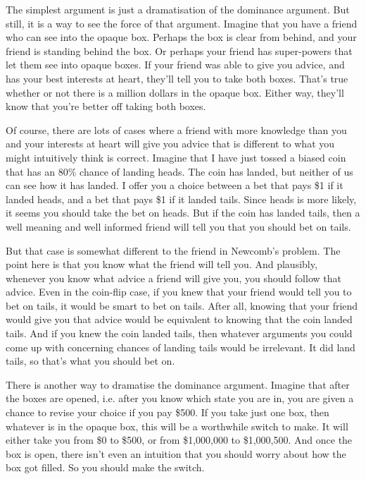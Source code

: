The simplest argument is just a dramatisation of the dominance argument. But still, it is a way to see the force of that argument. Imagine that you have a friend who can see into the opaque box. Perhaps the box is clear from behind, and your friend is standing behind the box. Or perhaps your friend has super-powers that let them see into opaque boxes. If your friend was able to give you advice, and has your best interests at heart, they'll tell you to take both boxes. That's true whether or not there is a million dollars in the opaque box. Either way, they'll know that you're better off taking both boxes.

Of course, there are lots of cases where a friend with more knowledge than you and your interests at heart will give you advice that is different to what you might intuitively think is correct. Imagine that I have just tossed a biased coin that has an 80\% chance of landing heads. The coin has landed, but neither of us can see how it has landed. I offer you a choice between a bet that pays \$1 if it landed heads, and a bet that pays \$1 if it landed tails. Since heads is more likely, it seems you should take the bet on heads. But if the coin has landed tails, then a well meaning and well informed friend will tell you that you should bet on tails.

But that case is somewhat different to the friend in Newcomb's problem. The point here is that you know what the friend will tell you. And plausibly, whenever you know what advice a friend will give you, you should follow that advice. Even in the coin-flip case, if you knew that your friend would tell you to bet on tails, it would be smart to bet on tails. After all, knowing that your friend would give you that advice would be equivalent to knowing that the coin landed tails. And if you knew the coin landed tails, then whatever arguments you could come up with concerning chances of landing tails would be irrelevant. It did land tails, so that's what you should bet on.

There is another way to dramatise the dominance argument. Imagine that after the boxes are opened, i.e. after you know which state you are in, you are given a chance to revise your choice if you pay \$500. If you take just one box, then whatever is in the opaque box, this will be a worthwhile switch to make. It will either take you from \$0 to \$500, or from \$1,000,000 to \$1,000,500. And once the box is open, there isn't even an intuition that you should worry about how the box got filled. So you should make the switch.

